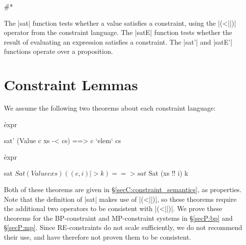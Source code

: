 \h{#*}

The |sat| function tests whether a value satisfies a constraint, using the |(<||)| operator from the constraint language. The |satE| function tests whether the result of evaluating an expression satisfies a constraint. The |sat'| and |satE'| functions operate over a proposition.

\section{Constraint Lemmas}

We assume the following two theorems about each constraint language:


\h{expr}\begin{code}
sat' (Value c xs -< cs) ==> c `elem` cs
\end{code}


\h{expr}\begin{code}
sat $ Sat (Value c xs) ((c,i) |> k) ==> sat $ Sat (xs !! i) k
\end{code}

Both of these theorems are given in \S\ref{secC:constraint_semantics}, as properties. Note that the definition of |sat| makes use of |(<||)|, so these theorems require the additional two operators to be consistent with |(<||)|. We prove these theorems for the BP-constraint and MP-constraint systems in \S\ref{secP:bp} and \S\ref{secP:mp}. Since RE-constraints do not scale sufficiently, we do not recommend their use, and have therefore not proven them to be consistent.

